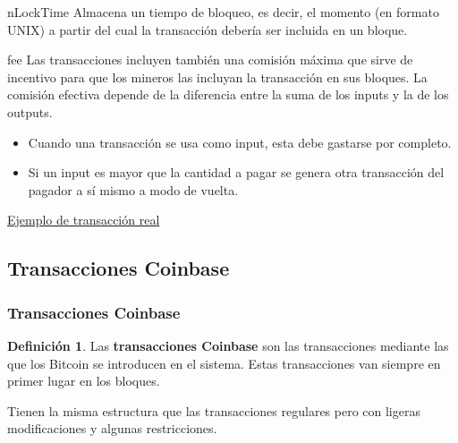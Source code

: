 \documentclass{beamer}
\theoremstyle{definition}
\newtheorem{defi}{Definición}
\begin{document}
\begin{frame}

	\begin{block}{nLockTime}
		Almacena un tiempo de bloqueo, es decir, el momento (en formato UNIX) a partir del cual la transacción debería ser incluida en un bloque.
	\end{block}\pause

\begin{block}{fee}
	Las transacciones incluyen también una comisión máxima que sirve de incentivo para que los mineros las incluyan la transacción en sus bloques. La comisión efectiva depende de la diferencia entre la suma de los inputs y la de los outputs.
\end{block}
\end{frame}

\begin{frame}
	\begin{itemize}
		\item<1-> Cuando una transacción se usa como input, esta debe gastarse por completo.
		\item<2-> Si un input es mayor que la cantidad a pagar se genera otra transacción del pagador a sí mismo a modo de vuelta.
	\end{itemize}
\end{frame}

\begin{frame}
	\href{https://api.blockcypher.com/v1/btc/main/txs/0142f951d09eb4df18eeff1879d548974f3afd6b94443dff5b2aba4ce5d5a403?limit=50&includeHex=true}{Ejemplo de transacción real} 
	
\end{frame}
\subsection{Transacciones Coinbase}
\begin{frame}
	\frametitle{Transacciones Coinbase}
	\begin{defi}
		Las \textbf{transacciones Coinbase} son las transacciones mediante las que los Bitcoin se introducen en el sistema. Estas transacciones van siempre en primer lugar en los bloques. 
	\end{defi}\pause

Tienen la misma estructura que las transacciones regulares pero con ligeras modificaciones y algunas restricciones.
\end{frame}
\end{document}
